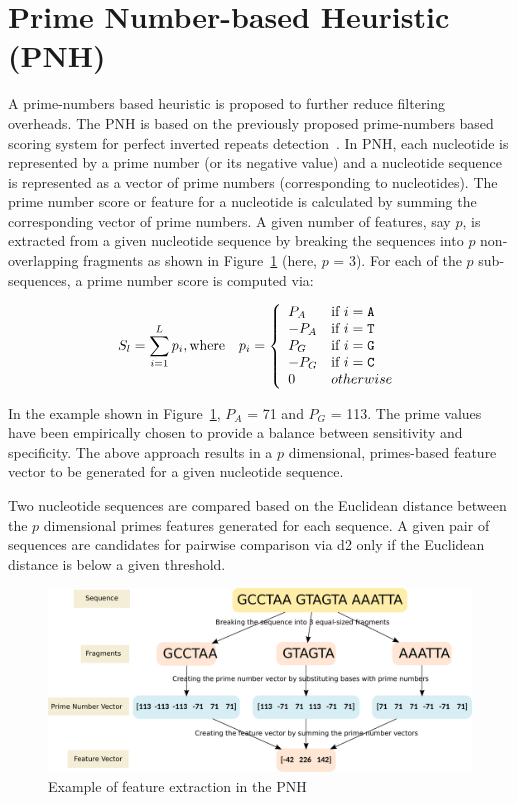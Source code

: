 \section{Prime Number-based Heuristic (PNH)}\label{sec:pnh}

A prime-numbers based heuristic is proposed to further reduce
filtering overheads.  The PNH is based on the previously proposed
prime-numbers based scoring system for perfect inverted repeats
detection~\cite{sreeskandarajan-14}. In PNH, each nucleotide is
represented by a prime number (or its negative value) and a nucleotide
sequence is represented as a vector of prime numbers (corresponding to
nucleotides). The prime number score or feature for a nucleotide is
calculated by summing the corresponding vector of prime numbers. A
given number of features, say $p$, is extracted from a given
nucleotide sequence by breaking the sequences into $p$ non-overlapping
fragments as shown in Figure~\ref{fig:pnh} (here, $p$ = 3).  For each
of the $p$ sub-sequences, a prime number score is computed via:

$$
S_{l} = \sum_{i=1}^{L} p_{i}, \textrm{where} \quad p_{i} = \left\{
\begin{array}{ll}
  P_{A}  & \textrm{if } i = \texttt{A}\\
  -P_{A} & \textrm{if } i = \texttt{T}\\
  P_{G}  & \textrm{if } i = \texttt{G}\\
  -P_{G} & \textrm{if } i = \texttt{C}\\
  0 & otherwise
\end{array}\right.
$$

In the example shown in Figure~\ref{fig:pnh}, $P_{A}$ = 71 and $P_{G}$
= 113.  The prime values have been empirically chosen to provide a
balance between sensitivity and specificity.  The above approach
results in a $p$ dimensional, primes-based feature vector to be
generated for a given nucleotide sequence.

Two nucleotide sequences are compared based on the Euclidean distance
between the $p$ dimensional primes features generated for each
sequence.  A given pair of sequences are candidates for pairwise
comparison via d2 only if the Euclidean distance is below a given
threshold.

\begin{figure}
  \includegraphics[width=\linewidth]{figures/PrimeNumberScoring.pdf}
  \caption{Example of feature extraction in the PNH}\label{fig:pnh}
\end{figure}

